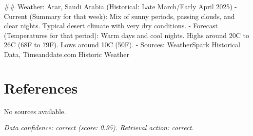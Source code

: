 \documentclass{article}
\begin{document}
## Weather: Arar, Saudi Arabia (Historical: Late March/Early April 2025)
- Current (Summary for that week): Mix of sunny periods, passing clouds, and clear nights. Typical desert climate with very dry conditions.
- Forecast (Temperatures for that period): Warm days and cool nights. Highs around 20\textdegree{}C to 26\textdegree{}C (68\textdegree{}F to 79\textdegree{}F). Lows around 10\textdegree{}C (50\textdegree{}F).
- Sources: WeatherSpark Historical Data, Timeanddate.com Historic Weather

\section{References}
\begin{enumerate}
No sources available.
\end{enumerate}

\textit{Data confidence: correct (score: 0.95). Retrieval action: correct.}
\end{document}
